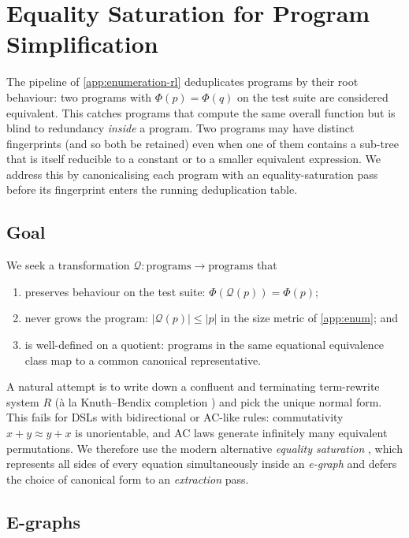 \documentclass[12pt]{article}
\begin{document}
\section{Equality Saturation for Program Simplification}
\label{app:program-simplification}

The pipeline of \cref{app:enumeration-rl} deduplicates programs by their root behaviour: two programs with $\Phi(p) = \Phi(q)$ on the test suite are considered equivalent. This catches programs that compute the same overall function but is blind to redundancy \emph{inside} a program. Two programs may have distinct fingerprints (and so both be retained) even when one of them contains a sub-tree that is itself reducible to a constant or to a smaller equivalent expression. We address this by canonicalising each program with an equality-saturation pass before its fingerprint enters the running deduplication table.

\subsection{Goal}\label{app:simp-goal}

We seek a transformation $\mathcal{Q}: \mathrm{programs} \to \mathrm{programs}$ that
\begin{enumerate}
  \item preserves behaviour on the test suite: $\Phi(\mathcal{Q}(p)) = \Phi(p)$;
  \item never grows the program: $|\mathcal{Q}(p)| \leq |p|$ in the size metric of \cref{app:enum}; and
  \item is well-defined on a quotient: programs in the same equational equivalence class map to a common canonical representative.
\end{enumerate}
A natural attempt is to write down a confluent and terminating term-rewrite system $R$ (à la Knuth--Bendix completion \citep{knuth1970simple}) and pick the unique normal form. This fails for DSLs with bidirectional or AC-like rules: commutativity $x+y \approx y+x$ is unorientable, and AC laws generate infinitely many equivalent permutations. We therefore use the modern alternative \emph{equality saturation} \citep{tate2009equality, willsey2021egg}, which represents all sides of every equation simultaneously inside an \emph{e-graph} and defers the choice of canonical form to an \emph{extraction} pass.

\subsection{E-graphs}\label{app:egraph}
\end{document}
